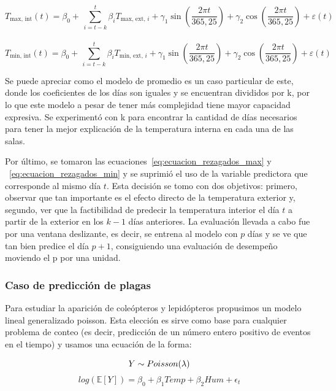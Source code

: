 \documentclass[11pt,a4paper]{article}
\begin{document}
\begin{equation}
T_{\text{max, int}}(t) = \beta_0 + \, \sum_{i=t-k}^{t}\beta_iT_{\text{max, ext, } i} + \gamma_1 \sin\left(\frac{2\pi t}{365{,}25}\right) + \gamma_2 \cos\left(\frac{2\pi t}{365{,}25}\right) + \varepsilon(t)
\label{eq:ecuacion_rezagados_max}
\end{equation}
\\
\begin{equation}
T_{\text{min, int}}(t) = \beta_0 + \, \sum_{i=t-k}^{t}\beta_iT_{\text{min, ext, } i} + \gamma_1 \sin\left(\frac{2\pi t}{365{,}25}\right) + \gamma_2 \cos\left(\frac{2\pi t}{365{,}25}\right) + \varepsilon(t)
\label{eq:ecuacion_rezagados_min}
\end{equation}

Se puede apreciar como el modelo de promedio es un caso particular de este, donde los coeficientes de los días son iguales y se encuentran divididos por k, por lo que este modelo a pesar de tener más complejidad tiene mayor capacidad expresiva. Se experimentó con k para encontrar la cantidad de días necesarios para tener la mejor explicación de la temperatura interna en cada una de las salas.

Por último, se tomaron las ecuaciones~\ref{eq:ecuacion_rezagados_max} y ~\ref{eq:ecuacion_rezagados_min} y se suprimió el uso de la variable predictora que corresponde al mismo día $t$. Esta decisión se tomo con dos objetivos: primero, observar que tan importante es el efecto directo de la temperatura exterior y, segundo, ver que la factibilidad de predecir la temperatura interior el día $t$ a partir de la exterior en los $k-1$ días anteriores. La evaluación llevada a cabo fue por una ventana deslizante, es decir, se entrena al modelo con $p$ días y se ve que tan bien predice el día $p+1$, consiguiendo una evaluación de desempeño moviendo el p por una unidad. 

\subsubsection{Caso de predicción de plagas}
Para estudiar la aparición de coleópteros y lepidópteros propusimos un modelo lineal generalizado poisson. Esta elección es sirve como base para cualquier problema de conteo (es decir, predicción de un número entero positivo de eventos en el tiempo) y usamos una ecuación de la forma:

\begin{equation}
Y \sim Poisson(\lambda) \\
\end{equation}
\begin{equation}
log(\mathbb{E}[Y]) = \beta_0 + \beta_1 Temp + \beta_2 Hum +\epsilon_t
\label{eq:modelo_poisson}
\end{equation}
\end{document}
